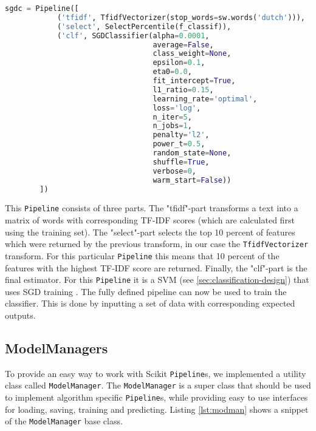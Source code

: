 \begin{lstlisting}[language=python, caption={SGDC Pipeline}, label={lst:sdgc}]
sgdc = Pipeline([
            ('tfidf', TfidfVectorizer(stop_words=sw.words('dutch'))),
            ('select', SelectPercentile(f_classif)),
            ('clf', SGDClassifier(alpha=0.0001,
                                  average=False,
                                  class_weight=None,
                                  epsilon=0.1,
                                  eta0=0.0,
                                  fit_intercept=True,
                                  l1_ratio=0.15,
                                  learning_rate='optimal',
                                  loss='log',
                                  n_iter=5,
                                  n_jobs=1,
                                  penalty='l2',
                                  power_t=0.5,
                                  random_state=None,
                                  shuffle=True,
                                  verbose=0,
                                  warm_start=False))
        ])
\end{lstlisting}
This \texttt{Pipeline} consists of three parts. The "tfidf"-part transforms a text into a matrix of words with corresponding TF-IDF scores (which are calculated first using the training set). The "select"-part selects the top 10 percent of features which were returned by the previous transform, in our case the \texttt{TfidfVectorizer} transform. For this particular \texttt{Pipeline} this means that 10 percent of the features with the highest TF-IDF score are returned. Finally, the "clf"-part is the final estimator. For this \texttt{Pipeline} it is a SVM (see \ref{sec:classification-design}) that uses SGD training \cite{bottou2010large}. 
The fully defined pipeline can now be used to train the classifier. This is done by inputting a set of data with corresponding expected outputs.

\subsection{ModelManagers}
To provide an easy way to work with Scikit \texttt{Pipeline}s, we implemented a utility class called \texttt{ModelManager}. The \texttt{ModelManager} is a super class that should be used to implement algorithm specific \texttt{Pipeline}s, while providing easy to use interfaces for loading, saving, training and predicting. Listing \ref{lst:modman} shows a snippet of the \texttt{ModelManager} base class.

